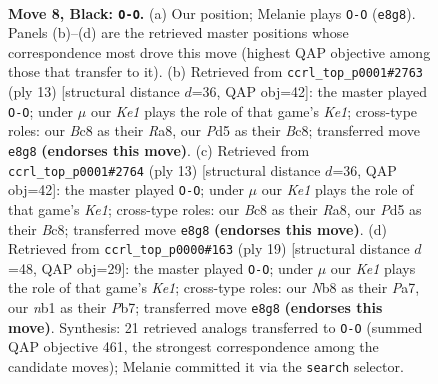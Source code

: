 \documentclass[11pt]{article}
\begin{document}
\begin{figure}[p]\centering
\begin{subfigure}{0.46\textwidth}\centering
\resizebox{\linewidth}{!}{%
\newchessgame
\chessboard[
  setfen={rnbqk2r/pp4pp/2pb1n2/3p1p2/3P4/5NP1/PP2PPBP/RNBQR1K1 b kq - 1 8},
  showmover=false,
  pgfstyle=straightmove, color=movearrow, markmove={e8-g8}
]}
\caption{}
\end{subfigure}\hfill
\begin{subfigure}{0.46\textwidth}\centering
\resizebox{\linewidth}{!}{%
\newchessgame
\chessboard[
  setfen={rnbqk2r/pp3ppp/3bpn2/3p4/3P4/P3PN2/1BP2PPP/RN1QKB1R b KQkq - 2 7},
  showmover=false,
  pgfstyle=straightmove, color=movearrow, markmove={e8-g8}
]}
\caption{}
\end{subfigure}
\\[4pt]
\begin{subfigure}{0.46\textwidth}\centering
\resizebox{\linewidth}{!}{%
\newchessgame
\chessboard[
  setfen={rnbqk2r/pp3ppp/3bpn2/3p4/3P4/P3PN2/1BP2PPP/RN1QKB1R b KQkq - 2 7},
  showmover=false,
  pgfstyle=straightmove, color=movearrow, markmove={e8-g8}
]}
\caption{}
\end{subfigure}\hfill
\begin{subfigure}{0.46\textwidth}\centering
\resizebox{\linewidth}{!}{%
\newchessgame
\chessboard[
  setfen={r1bqk2r/pp3ppp/2nbpn2/8/3P4/5NP1/PP2QPBP/RNB2RK1 b kq - 2 10},
  showmover=false,
  pgfstyle=straightmove, color=movearrow, markmove={e8-g8}
]}
\caption{}
\end{subfigure}
\caption{\textbf{Move 8, Black: \texttt{O-O}.} (a) Our position; Melanie plays \texttt{O-O} (\texttt{e8g8}). Panels (b)--(d) are the retrieved master positions whose correspondence most drove this move (highest QAP objective among those that transfer to it). (b) Retrieved from \texttt{ccrl\_top\_p0001\#2763} (ply 13) [structural distance $d$=36, QAP obj=42]: the master played \texttt{O-O}; under $\mu$ our \emph{Ke1} plays the role of that game's \emph{Ke1}; cross-type roles: our \emph{B}c8 as their \emph{R}a8, our \emph{P}d5 as their \emph{B}c8; transferred move \texttt{e8g8} \textbf{(endorses this move)}. (c) Retrieved from \texttt{ccrl\_top\_p0001\#2764} (ply 13) [structural distance $d$=36, QAP obj=42]: the master played \texttt{O-O}; under $\mu$ our \emph{Ke1} plays the role of that game's \emph{Ke1}; cross-type roles: our \emph{B}c8 as their \emph{R}a8, our \emph{P}d5 as their \emph{B}c8; transferred move \texttt{e8g8} \textbf{(endorses this move)}. (d) Retrieved from \texttt{ccrl\_top\_p0000\#163} (ply 19) [structural distance $d$=48, QAP obj=29]: the master played \texttt{O-O}; under $\mu$ our \emph{Ke1} plays the role of that game's \emph{Ke1}; cross-type roles: our \emph{N}b8 as their \emph{P}a7, our \emph{n}b1 as their \emph{P}b7; transferred move \texttt{e8g8} \textbf{(endorses this move)}. Synthesis: 21 retrieved analogs transferred to \texttt{O-O} (summed QAP objective 461, the strongest correspondence among the candidate moves); Melanie committed it via the \texttt{search} selector.}
\label{fig:thought-m15}
\end{figure}
\end{document}
